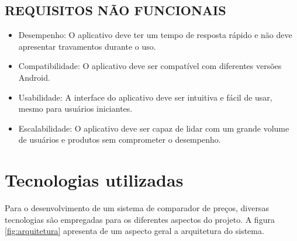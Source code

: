 \subsection{REQUISITOS NÃO FUNCIONAIS}
\begin{itemize}
  \item Desempenho: O aplicativo deve ter um tempo de resposta rápido e não deve apresentar travamentos durante o uso.
  \item Compatibilidade: O aplicativo deve ser compatível com diferentes versões Android.
  \item Usabilidade: A interface do aplicativo deve ser intuitiva e fácil de usar, mesmo para usuários iniciantes.
  \item Escalabilidade: O aplicativo deve ser capaz de lidar com um grande volume de usuários e produtos sem comprometer o desempenho.
\end{itemize}


\section{Tecnologias utilizadas} \label{sec:tecnologias}

Para o desenvolvimento de um sistema de comparador de preços, diversas tecnologias são empregadas para os diferentes aspectos do projeto. A figura \autoref{fig:arquitetura} apresenta de um aspecto geral a arquitetura do sistema.


